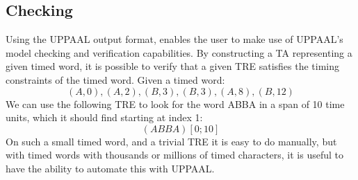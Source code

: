 \subsection{Checking}\label{subsec:checking}



Using the UPPAAL output format, enables the user to make use of UPPAAL's model checking and verification capabilities.
By constructing a TA representing a given timed word, it is possible to verify that a given TRE satisfies the timing constraints of the timed word.
Given a timed word: $$(A, 0), (A, 2), (B, 3), (B, 3), (A, 8), (B, 12)$$
We can use the following TRE to look for the word ABBA in a span of 10 time units, which it should find starting at index 1: $$(ABBA)[0;10]$$
On such a small timed word, and a trivial TRE it is easy to do manually, but with timed words with thousands or millions of timed characters, it is useful to have the ability to automate this with UPPAAL.

